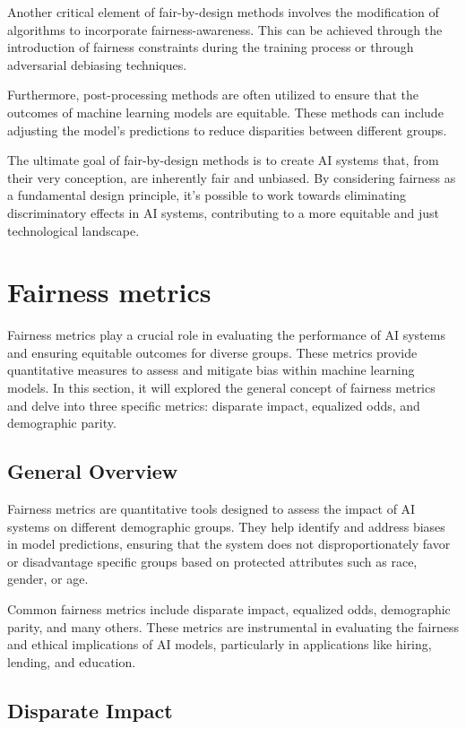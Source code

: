 \documentclass[12pt,a4paper,openright,twoside]{book}
\begin{document}
Another critical element of fair-by-design methods involves the modification of algorithms to incorporate fairness-awareness. This can be achieved through the introduction of fairness constraints during the training process or through adversarial debiasing techniques. 

Furthermore, post-processing methods are often utilized to ensure that the outcomes of machine learning models are equitable. These methods can include adjusting the model's predictions to reduce disparities between different groups. 

The ultimate goal of fair-by-design methods is to create AI systems that, from their very conception, are inherently fair and unbiased. By considering fairness as a fundamental design principle, it's possible to work towards eliminating discriminatory effects in AI systems, contributing to a more equitable and just technological landscape. 

\newpage
\section{Fairness metrics}
\label{section:metrics}

Fairness metrics play a crucial role in evaluating the performance of AI systems and ensuring equitable outcomes for diverse groups. These metrics provide quantitative measures to assess and mitigate bias within machine learning models. In this section, it will explored the general concept of fairness metrics and delve into three specific metrics: disparate impact, equalized odds, and demographic parity.

\subsection{General Overview}

Fairness metrics are quantitative tools designed to assess the impact of AI systems on different demographic groups. They help identify and address biases in model predictions, ensuring that the system does not disproportionately favor or disadvantage specific groups based on protected attributes such as race, gender, or age.

Common fairness metrics include disparate impact, equalized odds, demographic parity, and many others. These metrics are instrumental in evaluating the fairness and ethical implications of AI models, particularly in applications like hiring, lending, and education.

\subsection{Disparate Impact}
\end{document}
